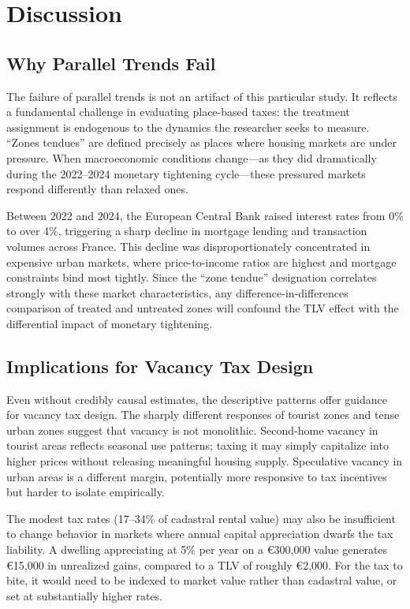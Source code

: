 \documentclass[12pt]{article}
\begin{document}
\section{Discussion}\label{sec:discussion}

\subsection{Why Parallel Trends Fail}

The failure of parallel trends is not an artifact of this particular study. It reflects a fundamental challenge in evaluating place-based taxes: the treatment assignment is endogenous to the dynamics the researcher seeks to measure. ``Zones tendues'' are defined precisely as places where housing markets are under pressure. When macroeconomic conditions change---as they did dramatically during the 2022--2024 monetary tightening cycle---these pressured markets respond differently than relaxed ones.

Between 2022 and 2024, the European Central Bank raised interest rates from 0\% to over 4\%, triggering a sharp decline in mortgage lending and transaction volumes across France. This decline was disproportionately concentrated in expensive urban markets, where price-to-income ratios are highest and mortgage constraints bind most tightly. Since the ``zone tendue'' designation correlates strongly with these market characteristics, any difference-in-differences comparison of treated and untreated zones will confound the TLV effect with the differential impact of monetary tightening.

\subsection{Implications for Vacancy Tax Design}

Even without credibly causal estimates, the descriptive patterns offer guidance for vacancy tax design. The sharply different responses of tourist zones and tense urban zones suggest that vacancy is not monolithic. Second-home vacancy in tourist areas reflects seasonal use patterns; taxing it may simply capitalize into higher prices without releasing meaningful housing supply. Speculative vacancy in urban areas is a different margin, potentially more responsive to tax incentives but harder to isolate empirically.

The modest tax rates (17--34\% of cadastral rental value) may also be insufficient to change behavior in markets where annual capital appreciation dwarfs the tax liability. A dwelling appreciating at 5\% per year on a \euro{300,000} value generates \euro{15,000} in unrealized gains, compared to a TLV of roughly \euro{2,000}. For the tax to bite, it would need to be indexed to market value rather than cadastral value, or set at substantially higher rates.
\end{document}

